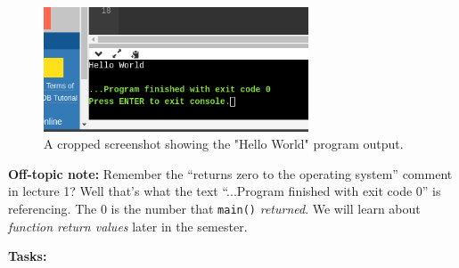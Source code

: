 \documentclass{lab}
\begin{document}
\begin{figure}[H]
\begin{center}
\includegraphics[width=0.7\textwidth]{onlinegdb_hello.png}
\end{center}
\caption{A cropped screenshot showing the "Hello World" program output.}\label{fig:onlinegdb_hello}
\end{figure}

\textbf{Off-topic note:} Remember the ``returns zero to the operating system'' comment in lecture 1? Well that's what the text ``...Program finished with exit code 0'' is referencing. The 0 is the number that \texttt{main()} \textit{returned}. We will learn about \textit{function return values} later in the semester.

\textbf{Tasks:} 
\end{document}

